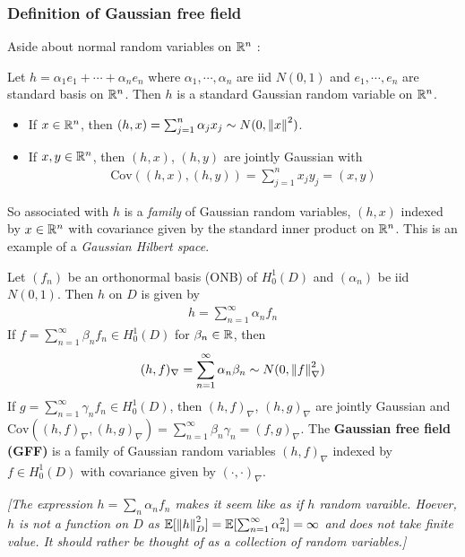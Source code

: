 \documentclass[12pt,a4paper]{article}
\begin{document}
\subsubsection*{Definition of Gaussian free field}

Aside about normal random variables on $\mathbb{R}^n$ :

Let $h= \alpha_1 e_1 + \cdots + \alpha_n e_n$ where $\alpha_1, \cdots, \alpha_n$ are iid $N(0,1)$ and $e_1,\cdots, e_n$ are standard basis on $\mathbb{R}^n$. Then $h$ is a standard Gaussian random variable on $\mathbb{R}^n$.
\begin{itemize}
\item If $x\in \mathbb{R}^n$, then $(h, x) = \sum_{j=1}^n \alpha_j x_j \sim N(0, \snorms{x}{}^2)$.
\item If $x,y\in \mathbb{R}^n$, then $(h,x)$, $(h,y)$ are jointly Gaussian with
\begin{align*}
\text{Cov}((h,x), (h,y)) = \sum_{j=1}^n x_j y_j = (x,y)
\end{align*}
\end{itemize}
So associated with $h$ is a \emph{family} of Gaussian random variables, $(h,x)$ indexed by $x\in \mathbb{R}^n$ with covariance given by the standard inner product on $\mathbb{R}^n$. This is an example of a \emph{Gaussian Hilbert space}.
\s

 Let $(f_n)$ be an orthonormal basis (ONB) of $H_0^1(D)$ and $(\alpha_n)$ be iid $N(0,1)$. Then $h$ on $D$ is given by
\begin{align*}
h = \sum_{n=1}^{\infty} \alpha_n f_n
\end{align*}
If $f= \sum_{n=1}^{\infty} \beta_n f_n \in H_0^1(D)$ for $\beta_n \in \mathbb{R}$, then
\begin{align*}
(h, f)_{\nabla} = \sum_{n=1}^{\infty} \alpha_n \beta_n \sim N(0, \snorms{f}{\nabla}^2)
\end{align*}
If  $g= \sum_{n=1}^{\infty} \gamma_n f_n \in H_0^1(D)$, then $(h, f)_{\nabla}$, $(h,g)_{\nabla}$ are jointly Gaussian and $\text{Cov}((h,f)_{\nabla}, (h,g)_{\nabla}) = \sum_{n=1}^{\infty} \beta_n \gamma_n = (f,g)_{\nabla}$. The \textbf{Gaussian free field (GFF)} is a family of Gaussian random variables $(h,f)_{\nabla}$ indexed by $f\in H_0^1(D)$ with covariance given by $(\cdot, \cdot)_{\nabla}$.

\emph{[The expression $h =\sum_n \alpha_n f_n$ makes it seem like as if $h$ random varaible. Hoever, $h$ is not a function on $D$ as $\avg[\snorms{h}{D}^2] = \avg[\sum_{n=1}^{\infty} \alpha_n^2] = \infty$ and does not take finite value. It should rather be thought of as a collection of random variables.]}
\s
\end{document}
